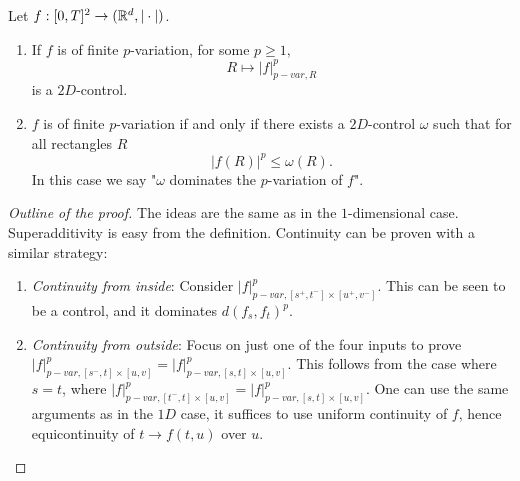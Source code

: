 \begin{lemma}
    Let $f:[0,T]^2 \rightarrow (\mathbb{R}^d, | \cdot |)$.
    \begin{enumerate}
        \item If $f$ is of finite $p$-variation, for some $p \ge 1,$
        \begin{equation}
            R \mapsto |f|^p_{p-var,R}
        \end{equation}
        is a $2D$-control.
        \item $f$ is of finite $p$-variation if and only if there exists a $2D$-control $\omega$ such that for all rectangles $R$ 
        \begin{equation}
            |f(R)|^p \le \omega(R).
        \end{equation}
        In this case we say "$\omega$ dominates the $p$-variation of $f$".
    \end{enumerate}
\end{lemma}
\begin{proof}[Outline of the proof]
    The ideas are the same as in the $1$-dimensional case. 
    Superadditivity is easy from the definition.
    Continuity can be proven with a similar strategy:
    \begin{enumerate}
        \item \textit{Continuity from inside}:
        Consider $|f|^p_{p-var, [s^+,t^-] \times [u^+,v^-]}.$ This can be seen to be a control, and it dominates $d(f_s,f_t)^p.$
        \item \textit{Continuity from outside}:
        Focus on just one of the four inputs to prove $|f|^p_{p-var, [s^-,t] \times [u,v]} = |f|^p_{p-var, [s,t] \times [u,v]}$.
        This follows from the case where $s = t$, where $|f|^p_{p-var, [t^-,t] \times [u,v]} = |f|^p_{p-var, [s,t] \times [u,v]}$.
        One can use the same arguments as in the $1D$ case, it suffices to use uniform continuity of $f$, hence equicontinuity of $t \rightarrow f(t,u)$ over $u$.
    \end{enumerate}
\end{proof}

